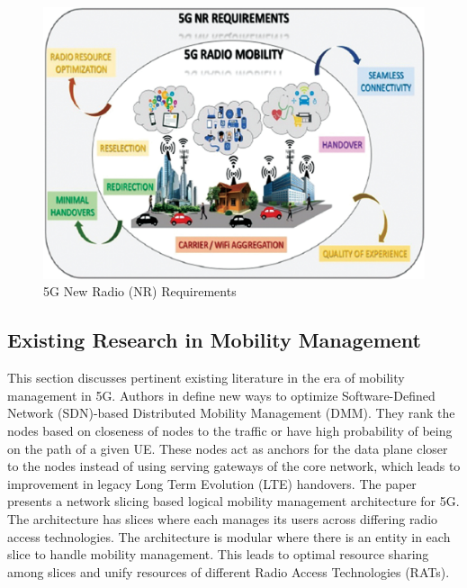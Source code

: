 \begin{multicols}{2}
\begin{figure}[H]
\centering
\includegraphics[scale=.75]{src/Figures/chap1/chap1-fig02.jpg}
\caption{5G New Radio (NR) Requirements }\label{chap1-fig02}
\vspace{-.4cm}
\end{figure}


\subsection{Existing Research in Mobility Management}

This section discusses pertinent existing literature in the era of mobility management in 5G. Authors in \cite{art1-key03} define new ways to optimize Software-Defined Network (SDN)-based Distributed Mobility Management (DMM). They rank the nodes based on closeness of nodes to the traffic or have high probability of being on the path of a given UE. These nodes act as anchors for the data plane closer to the nodes instead of using serving gateways of the core network, which leads to  improvement in legacy Long Term Evolution (LTE) handovers.  The paper \cite{art1-key04} presents a network slicing based logical mobility management architecture for 5G. The architecture has slices where each manages its users across differing radio access technologies. The architecture is modular where there is an entity in each slice to handle mobility management. This leads to optimal resource sharing among slices and unify resources of different Radio Access Technologies (RATs).


\end{multicols}
